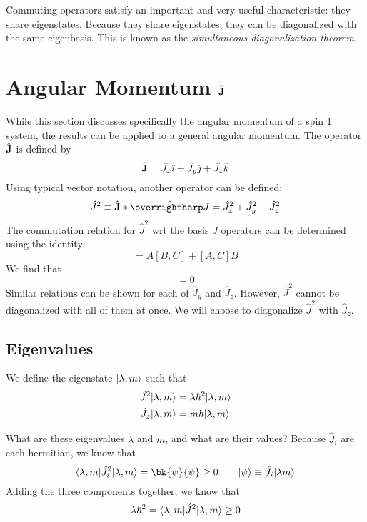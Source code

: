 \begin{aside}
	Commuting operators satisfy an important and very useful characteristic: they share eigenstates. Because they share eigenstates, they can be diagonalized with the same eigenbasis. This is known as the \emph{simultaneous diagonalization theorem}. 
\end{aside}

\section{Angular Momentum \texorpdfstring{\(\hat{\mathbf{J}}\)}{J op}}
While this section discusses specifically the angular momentum of a spin 1 system, the results can be applied to a general angular momentum. The operator \(\hat {\mathbf{J} } \) is defined by
\begin{equation}
	\hat{\mathbf{J}} = \hat{J}_x \hat{\imath} + \hat{J}_y \hat{\jmath} + \hat{J}_z \hat{k}
\end{equation}
Using typical vector notation, another operator can be defined:
\begin{equation}
	\hat{J}^2\equiv \hat{\vb{J}}*\hat{\vv{J}}=\hat J_x^2+\hat J_y^2 + \hat J_z^2
\end{equation}
The commutation relation for \(\hat J^2\) wrt the basis \(J\) operators can be determined using the identity:
\begin{equation}
	[AB,C]=A[B,C]+[A,C]B
\end{equation}
We find that
\begin{equation}
	[\hat{J^2}, \hat{J}_x]=0
\end{equation}
Similar relations can be shown for each of \(\hat J_y\) and \(\hat J_z\). However, \(\hat{J}^2\) cannot be diagonalized with all of them at once. We will choose to diagonalize \(\hat{J}^2\) with \(\hat{J}_z\).

\subsection{Eigenvalues}
We define the eigenstate \(\lvert\lambda, m\rangle\) such that
\begin{subequations}
	\begin{align}
		\hat{J}^2\lvert\lambda, m\rangle &= \lambda\hbar^2\lvert\lambda, m\rangle\\
		\hat{J}_z\lvert\lambda, m\rangle &= m\hbar \lvert\lambda, m\rangle
	\end{align}
\end{subequations}

What are these eigenvalues \(\lambda\) and \(m\), and what are their values? Because \(\hat{J}_i\) are each hermitian, we know that 
\[\b{\lambda,m}\hat{J}_i^2\k{\lambda, m}= \bk{\p}{\p}\geq 0 \qquad \k\p\equiv \hat{J}_i\k{\lambda m}\]
Adding the three components together, we know that
\[\lambda \hbar^2= \langle\lambda,m\rvert\hat J^2\lvert\lambda,m\rangle\geq 0\]

